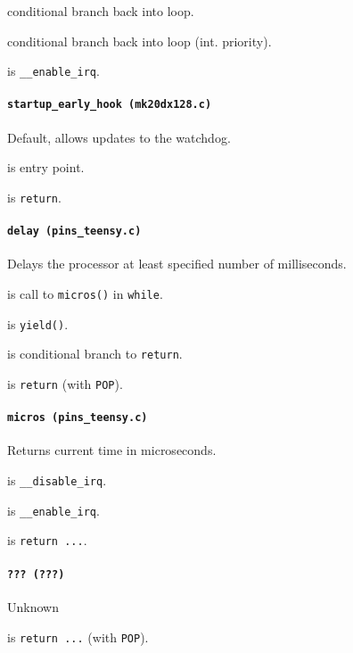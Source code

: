  conditional branch back into loop.

\vspace{1em}

 conditional branch back into loop (int. priority).

\vspace{1em}

 is \texttt{\_\_enable\_irq}.

\paragraph{\texttt{startup\_early\_hook (mk20dx128.c)}} Default, allows updates
to the watchdog.

 is entry point.

 is \texttt{return}.

\paragraph{\texttt{delay (pins\_teensy.c)}} Delays the processor at least
specified number of milliseconds.

 is call to \texttt{micros()} in \texttt{while}.

 is \texttt{yield()}.

 is conditional branch to \texttt{return}.

 is \texttt{return} (with \texttt{POP}).

\paragraph{\texttt{micros (pins\_teensy.c)}} Returns current time in
microseconds.

 is \texttt{\_\_disable\_irq}.

 is \texttt{\_\_enable\_irq}.

 is \texttt{return ...}.

\paragraph{\texttt{??? (???)}} Unknown

 is \texttt{return ...} (with \texttt{POP}).

